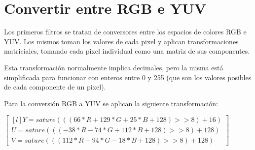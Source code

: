 
\section{Convertir entre RGB e YUV}

Los primeros filtros se tratan de conversores entre los espacios de colores RGB e YUV. Los mismos toman los valores de cada pixel y aplican transformaciones matriciales, tomando cada pixel individual como una matriz de sus componentes.

Esta transformación normalmente implica decimales, pero la misma está simplificada para funcionar con enteros entre 0 y 255 (que son los valores posibles de cada componente de un pixel).

Para la conversión RGB a YUV se aplican la siguiente transformación:

\begin{center}

	$
	\begin{bmatrix*}[l]
	Y = sature(((66 * R + 129 * G + 25 * B + 128) >> 8) + 16) \\
	U = sature(((-38 * R - 74 * G + 112 * B + 128) >> 8) + 128) \\
	V = sature(((112 * R - 94 * G - 18 * B + 128) >> 8) + 128)
	\end{bmatrix*}
	$

\end{center}

